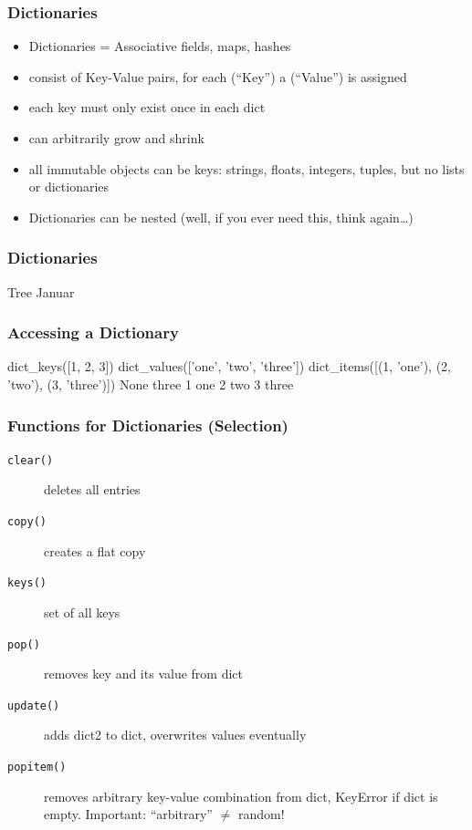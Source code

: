 \documentclass[english]{beamer}
\newcommand{\ta}[1]{\textattachfile[color=1 0 0]{#1}{Code}}
\newcommand{\pypy}[2]{}
\begin{document}
\begin{frame}
\frametitle{Dictionaries}

\begin{itemize}
\item Dictionaries = Associative fields, maps, hashes
\item consist of Key-Value pairs, for each (\enquote{Key}) a (\enquote{Value}) is assigned
\item each key must only exist once in each dict
\item can arbitrarily grow and shrink
\item all immutable objects can be keys: strings, floats, integers, tuples, but no lists or dictionaries
\item Dictionaries can be nested (well, if you ever need this, think again\ldots)
\end{itemize}
\end{frame}

\begin{frame}[containsverbatim]
\frametitle{Dictionaries}

\pypy{dict-01.py}{Codes/dict-01.py}

\begin{ausgabe}
Tree
Januar
\end{ausgabe}

\end{frame}


\begin{frame}[containsverbatim]
\frametitle{Accessing a Dictionary}

\vspace*{-0.5em}\pypy{dict-04.py}{Codes/dict-04.py}

\vspace*{-0.5em}\begin{ausgabe}
dict_keys([1, 2, 3])
dict_values(['one', 'two', 'three'])
dict_items([(1, 'one'), (2, 'two'), (3, 'three')])
None
three
1 one
2 two
3 three
\end{ausgabe}

\end{frame}



\begin{frame}[containsverbatim]
\frametitle{Functions for Dictionaries (Selection)}

\begin{description}
\item[\texttt{clear()}] deletes all entries
\item[\texttt{copy()}] creates a flat copy
\item[\texttt{keys()}] set of all keys
\item[\texttt{pop()}] removes key and its value from dict
\item[\texttt{update()}] adds dict2 to dict, overwrites values eventually
\item[\texttt{popitem()}] removes arbitrary key-value combination from dict, KeyError if dict is empty. Important: \enquote{arbitrary} $\not=$ {random}!
\end{description}

\end{frame}
\end{document}
